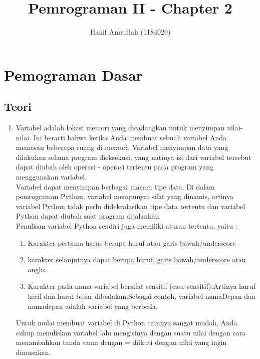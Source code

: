 \documentclass[12pt]{article}
\begin{document}
\title{Pemrograman II - Chapter 2}
\author{Hanif Amrullah (1184020)}
\date{}
\maketitle

\section{Pemograman Dasar}
	\subsection{Teori}
		\begin{enumerate}
			\item Variabel adalah lokasi memori yang dicadangkan untuk menyimpan nilai-nilai. Ini berarti bahwa ketika Anda membuat sebuah variabel Anda memesan beberapa ruang di memori. Variabel menyimpan data yang dilakukan selama program dieksekusi, yang natinya isi dari variabel tersebut dapat diubah oleh operasi - operasi tertentu pada program yang menggunakan variabel.\\
			
			Variabel dapat menyimpan berbagai macam tipe data. Di dalam pemrograman Python, variabel mempunyai sifat yang dinamis, artinya variabel Python tidak perlu didekralasikan tipe data tertentu dan variabel Python dapat diubah saat program dijalankan.\\
			
			Penulisan variabel Python sendiri juga memiliki aturan tertentu, yaitu :
			\begin{enumerate}
				\item Karakter pertama harus berupa huruf atau garis bawah/underscore
				\item karakter selanjutnya dapat berupa huruf, garis bawah/underscore atau angka
				\item Karakter pada nama variabel bersifat sensitif (case-sensitif).Artinya huruf kecil dan huruf besar dibedakan.Sebagai contoh, variabel namaDepan dan namadepan adalah variabel yang berbeda.
			\end{enumerate}
			
			Untuk mulai membuat variabel di Python caranya sangat mudah, Anda cukup menuliskan variabel lalu mengisinya dengan suatu nilai dengan cara menambahkan tanda sama dengan = diikuti dengan nilai yang ingin dimasukan.
			

\end{enumerate}
\end{document}
